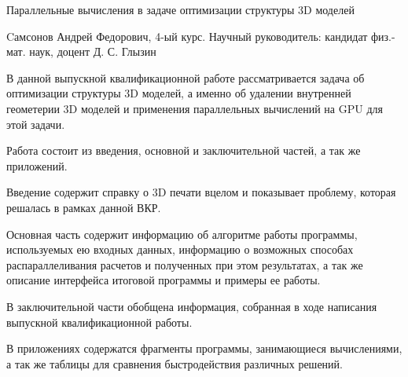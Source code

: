 


\titlepage
\begin{center}\Large{Параллельные вычисления в задаче оптимизации структуры 3D моделей}\end{center}

Cамсонов Андрей Федорович, 4-ый курс.
\newline
Научный руководитель: кандидат физ.-мат. наук, доцент Д. С. Глызин
\newline

В данной выпускной квалификационной работе рассматривается задача об оптимизации структуры 3D моделей, а именно об удалении внутренней геометерии 3D моделей и применения параллельных вычислений на GPU для этой задачи.
\newline

Работа состоит из введения, основной и заключительной частей, а так же приложений.
\newline

Введение содержит справку о 3D печати вцелом и показывает проблему, которая решалась в рамках данной ВКР.
\newline

Основная часть содержит информацию об алгоритме работы программы, используемых ею входных данных, информацию о возможных способах распараллеливания расчетов и полученных при этом результатах, а так же описание интерфейса итоговой программы и примеры ее работы.
\newline

В заключительной части обобщена информация, собранная  в ходе написания выпускной квалификационной работы.
\newline

В приложениях содержатся фрагменты программы, занимающиеся вычислениями, а так же таблицы для сравнения быстродействия различных решений. 

